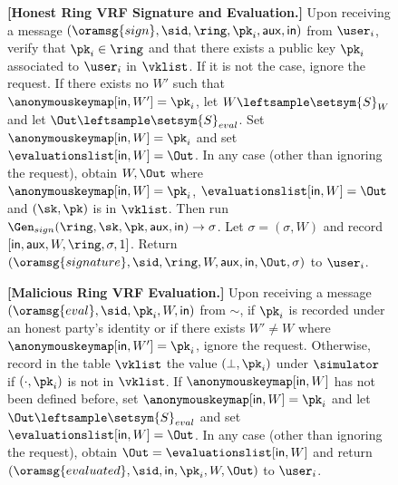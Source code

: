 \begin{figure}
\begin{tcolorbox}[left=2pt,right=2pt]
{			%
			\textbf{[Honest Ring VRF Signature and Evaluation.]} Upon receiving a message $(\oramsg{sign}, \sid, \ring, \pk_i,\aux, \msg)$ from $\user_i$, verify that $\pk_i \in \ring$ and that there exists a public key $\pk_i$ associated to $\user_i$ in $ \vklist $. If it is not the case, ignore the request. 	
			If there exists no $ W' $ such that $ \anonymouskeymap[\msg,W'] =  \pk_i $, let $ W \leftsample \setsym{S}_W $ and let $\Out \leftsample \setsym{S}_{eval}$. Set $ \anonymouskeymap[\msg,W] = \pk_i $ and set $ \evaluationslist[\msg, W] = \Out$.
			In any case (other than ignoring the request), obtain $ W, \Out$ where $ \anonymouskeymap[\msg,W] =\pk_i $, $ \evaluationslist[\msg, W] = \Out$ and  $ (\sk, \pk) $ is in $\vklist $. Then run  $ \Gen_{sign}(\ring,\sk,\pk,\aux,\msg) \rightarrow \sigma $.
			Let $ \sigma = (\sigma,W)$ and record $ [\msg,\aux, W, \ring,\sigma, 1] $. Return $(\oramsg{signature}, \sid, \ring,W,\aux,\msg, \Out, \sigma)$ to $\user_i$.
			
			\textbf{[Malicious Ring VRF Evaluation.]}  Upon receiving a message $(\oramsg{eval}, \allowbreak \sid, \allowbreak \pk_i, \allowbreak W, \msg)$ from $\sim$, if $ \pk_i $ is recorded under an honest party's identity or if there exists $ W'\neq W $ where $ \anonymouskeymap[\msg,W'] = \pk_i $, ignore the request.
			Otherwise, record in the table $\vklist$ the value $(\perp,\pk_i)$ under $\simulator$ if $ ( \cdot ,\pk_i) $ is not in $ \vklist $.
			If  $\anonymouskeymap[\msg,W]  $ has not been defined before, set $ \anonymouskeymap[\msg,W] = \pk_i $ and let   $\Out \leftsample \setsym{S}_{eval}$ and set $ \evaluationslist[\msg, W] = \Out$.
			In any case (other than ignoring the request), obtain $ \Out = \evaluationslist[\msg, W] $ and return $(\oramsg{evaluated}, \sid,  \msg, \pk_i,W, \Out)$ to $ \user_i $.
			
}
\end{tcolorbox}
\end{figure}
